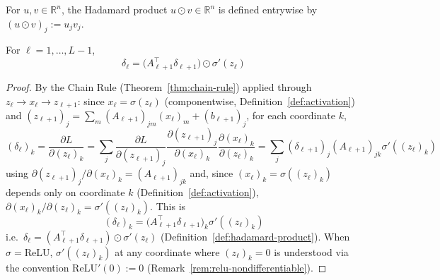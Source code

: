 		\begin{definition}
			\label{def:hadamard-product}
			For $u,v\in\mathbb{R}^n$, the Hadamard product $u\odot v\in\mathbb{R}^n$ is defined entrywise by $(u\odot v)_j := u_jv_j$.
		\end{definition}
		
		\begin{theorem}
			\label{thm:backward-recursion}
			For $\ell=1,\dots,L-1$,
			\[
				\delta_\ell = \big(A_{\ell+1}^\top\delta_{\ell+1}\big) \odot \sigma'(z_\ell)
			\]
		\end{theorem}
		
		\begin{proof}
			By the Chain Rule (Theorem~\ref{thm:chain-rule}) applied through $z_\ell \to x_\ell \to z_{\ell+1}$: since $x_\ell=\sigma(z_\ell)$ (componentwise, Definition~\ref{def:activation}) and $(z_{\ell+1})_j = \sum_m(A_{\ell+1})_{jm}(x_\ell)_m + (b_{\ell+1})_j$, for each coordinate $k$,
			\[
				(\delta_\ell)_k = \frac{\partial L}{\partial(z_\ell)_k} = \sum_j \frac{\partial L}{\partial(z_{\ell+1})_j} \frac{\partial(z_{\ell+1})_j}{\partial(x_\ell)_k} \frac{\partial(x_\ell)_k}{\partial(z_\ell)_k} = \sum_j (\delta_{\ell+1})_j(A_{\ell+1})_{jk} \sigma'((z_\ell)_k)
			\]
			using $\partial(z_{\ell+1})_j/\partial(x_\ell)_k=(A_{\ell+1})_{jk}$ and, since $(x_\ell)_k=\sigma((z_\ell)_k)$ depends only on coordinate $k$ (Definition~\ref{def:activation}), $\partial(x_\ell)_k/\partial(z_\ell)_k=\sigma'((z_\ell)_k)$. This is
			\[
				(\delta_\ell)_k = \big(A_{\ell+1}^\top\delta_{\ell+1}\big)_k \sigma'((z_\ell)_k)
			\]
			i.e.\ $\delta_\ell = (A_{\ell+1}^\top\delta_{\ell+1})\odot\sigma'(z_\ell)$ (Definition~\ref{def:hadamard-product}). When $\sigma=\mathrm{ReLU}$, $\sigma'((z_\ell)_k)$ at any coordinate where $(z_\ell)_k=0$ is understood via the convention $\mathrm{ReLU}'(0):=0$ (Remark~\ref{rem:relu-nondifferentiable}).
		\end{proof}
		
